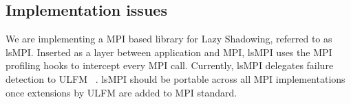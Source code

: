\subsection{Implementation issues}

%

We are implementing a MPI based library for Lazy Shadowing, referred to as lsMPI. Inserted as a layer between application and MPI, lsMPI uses the MPI profiling hooks to intercept every MPI call. Currently, lsMPI 
delegates failure detection to ULFM%
~\cite{Bland:2012:EUF:2404033.2404064,bland2013post}. 
lsMPI should be portable across all MPI implementations once extensions by ULFM are added to MPI standard.

